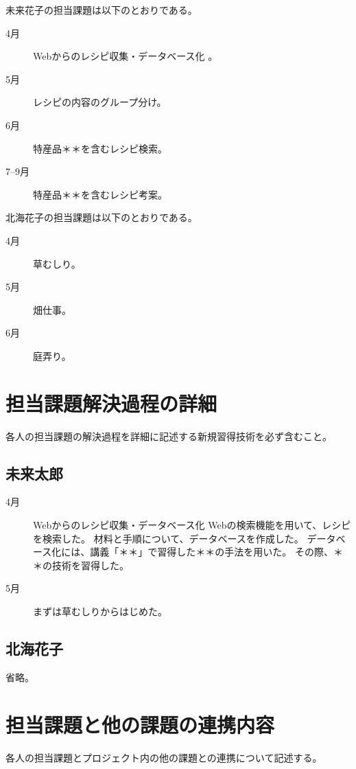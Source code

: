 \documentclass[openany,11pt,papersize]{jsbook}
\begin{document}
未来花子の担当課題は以下のとおりである。 
\begin{description}
 \item[4月] Webからのレシピ収集・データベース化 。
 \item[5月] レシピの内容のグループ分け。
 \item[6月] 特産品＊＊を含むレシピ検索。
 \item[7--9月]特産品＊＊を含むレシピ考案。
\end{description}

北海花子の担当課題は以下のとおりである。 
\begin{description}
 \item[4月] 草むしり。
 \item[5月] 畑仕事。
 \item[6月] 庭弄り。
\end{description}


\section{担当課題解決過程の詳細}
\begin{hissu}
各人の担当課題の解決過程を詳細に記述する新規習得技術を必ず含むこと。
\end{hissu}

\subsection{未来太郎}
\begin{description}
 \item[4月] Webからのレシピ収集・データベース化 
Webの検索機能を用いて、レシピを検索した。 
材料と手順について、データベースを作成した。 
データベース化には、講義「＊＊」で習得した＊＊の手法を用いた。 
その際、＊＊の技術を習得した。　　
 \item[5月]まずは草むしりからはじめた。
\end{description}



\subsection{北海花子}

省略。


\section{担当課題と他の課題の連携内容}
\begin{hissu}
各人の担当課題とプロジェクト内の他の課題との連携について記述する。
\end{hissu}
\end{document}
